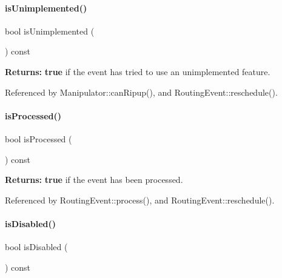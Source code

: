 \paragraph{\texorpdfstring{is\+Unimplemented()}{isUnimplemented()}}
{\footnotesize\ttfamily bool is\+Unimplemented (\begin{DoxyParamCaption}{ }\end{DoxyParamCaption}) const}

{\bfseries Returns\+:} {\bfseries true} if the event has tried to use an unimplemented feature. 

Referenced by Manipulator\+::can\+Ripup(), and Routing\+Event\+::reschedule().

\mbox{\label{classKite_1_1RoutingEvent_a83943e04f0ee0a5a38208278b97fc780}} 
\paragraph{\texorpdfstring{is\+Processed()}{isProcessed()}}
{\footnotesize\ttfamily bool is\+Processed (\begin{DoxyParamCaption}{ }\end{DoxyParamCaption}) const\hspace{0.3cm}{\ttfamily [inline]}}

{\bfseries Returns\+:} {\bfseries true} if the event has been processed. 

Referenced by Routing\+Event\+::process(), and Routing\+Event\+::reschedule().

\mbox{\label{classKite_1_1RoutingEvent_a50607443b762961229119228be30c5ad}} 
\paragraph{\texorpdfstring{is\+Disabled()}{isDisabled()}}
{\footnotesize\ttfamily bool is\+Disabled (\begin{DoxyParamCaption}{ }\end{DoxyParamCaption}) const\hspace{0.3cm}{\ttfamily [inline]}}

